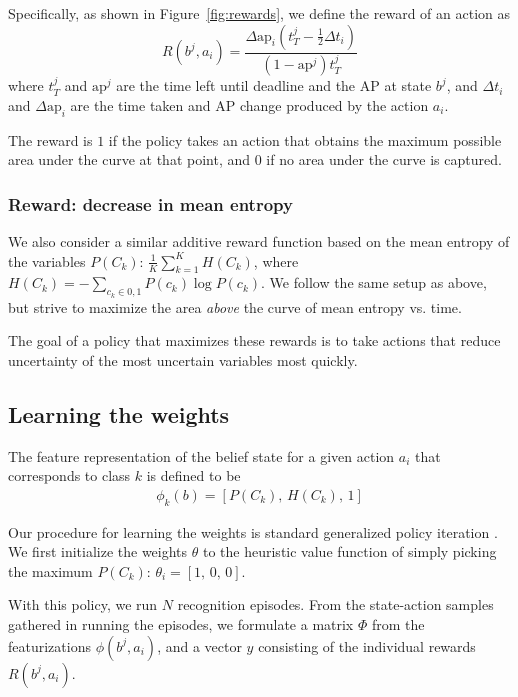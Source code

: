 Specifically, as shown in Figure~\ref{fig:rewards}, we define the reward of an action as
\begin{equation}\label{eq:advanced}
R(b^j,a_i) = \frac{\Delta \text{ap}_i (t_T^j-\frac{1}{2}\Delta t_i)}{(1-\text{ap}^j)t_T^j}
\end{equation}
where $t_T^j$ and $\text{ap}^j$ are the time left until deadline and the AP at state $b^j$, and $\Delta t_i$ and $\Delta \text{ap}_i$ are the time taken and AP change produced by the action $a_i$.

The reward is $1$ if the policy takes an action that obtains the maximum possible area under the curve at that point, and $0$ if no area under the curve is captured.

\subsubsection{Reward: decrease in mean entropy}
We also consider a similar additive reward function based on the mean entropy of the variables $P(C_k)$: $\frac{1}{K}\sum_{k=1}^K H(C_k)$, where $H(C_k) = - \sum_{c_k \in {0,1}} P(c_k) \log P(c_k)$.
We follow the same setup as above, but strive to maximize the area \emph{above} the curve of mean entropy vs. time.

The goal of a policy that maximizes these rewards is to take actions that reduce uncertainty of the most uncertain variables most quickly.

\subsection{Learning the weights}

The feature representation of the belief state for a given action $a_i$ that corresponds to class $k$ is defined to be
\begin{align}
\phi_k(b) = [P(C_k), \, H(C_k), \, 1]
\end{align}

Our procedure for learning the weights is standard generalized policy iteration \cite{Sutton1998}.
We first initialize the weights $\theta$ to the heuristic value function of simply picking the maximum $P(C_k)$: $\theta_i = [1, \,0, \,0]$.

With this policy, we run $N$ recognition episodes.
From the state-action samples gathered in running the episodes, we formulate a matrix $\Phi$ from the featurizations $\phi(b^j,a_i)$, and a vector $y$ consisting of the individual rewards $R(b^j,a_i)$.

